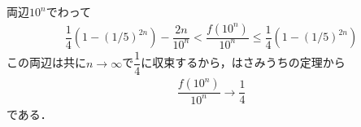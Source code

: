 \documentclass[../../main.tex]{subfiles}
\begin{document}
両辺$10^n$でわって
\begin{align}
  \dfrac{1}{4}\left(1-(1/5)^{2n}\right) -\dfrac{2n}{10^n}<\dfrac{f(10^n)}{10^n}\le \dfrac{1}{4}\left(1-(1/5)^{2n}\right)
\end{align}
この両辺は共に$n\to\infty$で$\dfrac{1}{4}$に収束するから，はさみうちの定理から
\begin{align}
  \dfrac{f(10^n)}{10^n}\longrightarrow\dfrac{1}{4}
\end{align}
である．

\newpage
\end{document}
